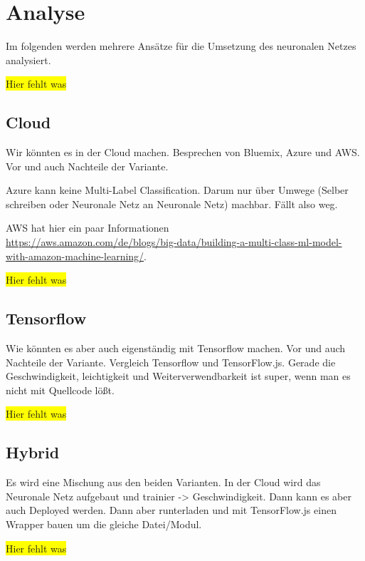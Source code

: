 \section{Analyse}
Im folgenden werden mehrere Ansätze für die Umsetzung des neuronalen Netzes analysiert.

\colorbox{yellow}{Hier fehlt was}

\subsection{Cloud}
Wir könnten es in der Cloud machen. Besprechen von Bluemix, Azure und AWS. Vor und auch Nachteile der Variante.

Azure kann keine Multi-Label Classification. Darum nur über Umwege (Selber schreiben oder Neuronale Netz an Neuronale Netz)
machbar. Fällt also weg.

AWS hat hier ein paar Informationen\\
\url{https://aws.amazon.com/de/blogs/big-data/building-a-multi-class-ml-model-with-amazon-machine-learning/}.

\colorbox{yellow}{Hier fehlt was}

\subsection{Tensorflow}
Wie könnten es aber auch eigenständig mit Tensorflow machen. Vor und auch Nachteile der Variante. Vergleich Tensorflow
und TensorFlow.js. Gerade die Geschwindigkeit, leichtigkeit und Weiterverwendbarkeit ist super, wenn man es nicht mit
Quellcode lößt.

\colorbox{yellow}{Hier fehlt was}

\subsection{Hybrid}
Es wird eine Mischung aus den beiden Varianten. In der Cloud wird das Neuronale Netz aufgebaut und trainier -> Geschwindigkeit.
Dann kann es aber auch Deployed werden. Dann aber runterladen und mit TensorFlow.js einen Wrapper bauen um die gleiche
Datei/Modul.

\colorbox{yellow}{Hier fehlt was}